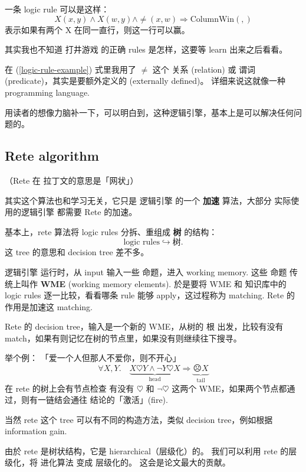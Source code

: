 一条 logic rule 可以是这样：
\begin{equation}
\label{logic-rule-example}
X(x, y) \wedge X(w, y) \wedge \neq(x,w) \Rightarrow \text{ColumnWin}(,)
\end{equation}
表示如果有两个 X 在同一直行，则这一行可以赢。

其实我也不知道 打井游戏 的正确 rules 是怎样，这要等 learn 出来之后看看。 

在 (\ref{logic-rule-example}) 式里我用了 $\neq$ 这个 关系 (relation) 或 谓词 (predicate)，其实是要额外定义的 (externally defined)。 详细来说这就像一种 programming language.

用读者的想像力脑补一下，可以明白到，这种逻辑引擎，基本上是可以解决任何问题的。 

\subsection{Rete algorithm}

（Rete 在 拉丁文的意思是「网状」）

其实这个算法也和学习无关，它只是 逻辑引擎 的一个 \textbf{加速} 算法，大部分 实际使用的逻辑引擎 都需要 Rete 的加速。

基本上，rete 算法将 logic rules 分拆、重组成 \textbf{树} 的结构：
\begin{equation}
\boxed{\text{logic rules}} \hookrightarrow \boxed{\text{树}} .
\end{equation}
这 tree 的意思和 decision tree 差不多。

逻辑引擎 运行时，从 input 输入一些 命题，进入 working memory.  这些 命题 传统上叫作 \textbf{WME} (working memory elements).  於是要将 WME 和 知识库中的 logic rules 逐一比较，看看哪条 rule 能够 apply，这过程称为 matching.  Rete 的作用是加速这 matching.

Rete 的 decision tree，输入是一个新的 WME，从树的 根 出发，比较有没有 match，如果有则记忆在树的节点里，如果没有则继续往下搜寻。

举个例： 「爱一个人但那人不爱你，则不开心」
\begin{equation}
\forall X, Y.  \quad \underbrace{X \heartsuit Y \wedge \neg Y \heartsuit X}_{\mbox{head}} \Rightarrow \underbrace{\frownie X}_{\mbox{tail}}
\end{equation}
在 rete 的树上会有节点检查 有没有 $\heartsuit$ 和 $\neg \heartsuit$ 这两个 WME，如果两个节点都通过，则有一链结会通往 结论的「激活」(fire). 

当然 rete 这个 tree 可以有不同的构造方法，类似 decision tree，例如根据 information gain. 

由於 rete 是树状结构，它是 hierarchical（层级化）的。 我们可以利用 rete 的层级化，将 进化算法 变成 层级化的。 这会是论文最大的贡献。

